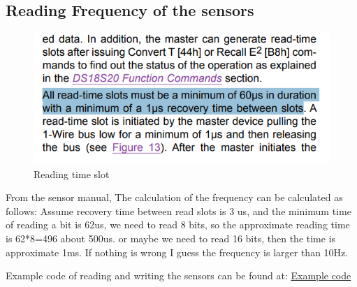 \documentclass{article}
\begin{document}
\subsection{Reading Frequency of the sensors}
\begin{figure}
\begin{center}
\includegraphics[scale=0.6]{sensor_manual.png}
\end{center}
\caption{Reading time slot}
\label{fig:readingtimeslot}
\end{figure}
From the sensor manual, The calculation of the frequency can be calculated as follows: Assume recovery time between read slots is 3 us, and the minimum time of reading a bit is 62us, we need to read 8 bits, so the approximate reading time is 62*8=496 about 500us.
or maybe we need to read 16 bits, then the time is approximate 1ms. If nothing is wrong I guess the frequency is larger than 10Hz.

Example code of reading and writing the sensors can be found at: \href{https://www.maximintegrated.com/en/design/technical-documents/app-notes/1/162.html}{Example code}
\end{document}
